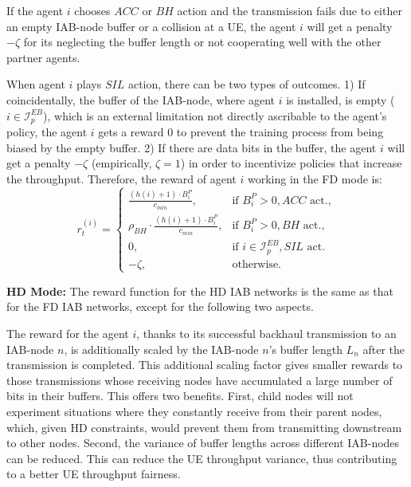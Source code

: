 If the agent $i$ chooses $ACC$ or $BH$ action and the transmission fails due to either an empty IAB-node buffer or a collision at a UE, the agent $i$ will get a penalty $-\zeta$ for its neglecting the buffer length or not cooperating well with the other partner agents.

When agent $i$ plays $SIL$ action, there can be two types of outcomes. 1) If coincidentally, the buffer of the IAB-node, where agent $i$ is installed, is empty ($i \in \mathcal{I}_p^{EB}$), which is an external limitation not directly ascribable to the agent's policy, the agent $i$ gets a reward 0 to prevent the training process from being biased by the empty buffer. 2) If there are data bits in the buffer, the agent $i$ will get a penalty $-\zeta$ (empirically, $\zeta=1$) in order to incentivize policies that increase the throughput. Therefore, the reward of agent $i$ working in the FD mode is:
	\begin{equation}
		r^{(i)}_t = \left\{ \begin{array}{lll}
			 \frac{(h(i)+1) \cdot B^P_i}{c_{min}}, & \text{if } B^P_i > 0, ACC \mbox{ act.},\\
			\rho_{BH} \cdot \frac{(h(i)+1)\cdot B^P_i}{c_{min}}, & \text{if } B^P_i> 0, BH \mbox{ act.},\\
			0, & \text{if } i \in \mathcal{I}^{EB}_p, SIL \mbox{ act.}\\
			-\zeta, & \text{otherwise}.
		\end{array}\right.
		\label{reward_iab_donor}
	\end{equation}


\textbf{HD Mode:} The reward function for the HD IAB networks is the same as that for the FD IAB networks, except for the following two aspects.

The reward for the agent $i$, thanks to its successful backhaul transmission to an IAB-node $n$, is additionally scaled by the IAB-node $n$'s buffer length $L_n$ after the transmission is completed. This additional scaling factor gives smaller rewards to those transmissions whose receiving nodes have accumulated a large number of bits in their buffers. This offers two benefits. First, child nodes will not experiment situations where they constantly receive from their parent nodes, which, given HD constraints, would prevent them from transmitting downstream to other nodes. Second, the variance of buffer lengths across different IAB-nodes can be reduced. This can reduce the UE throughput variance, thus contributing to a better UE throughput fairness.

